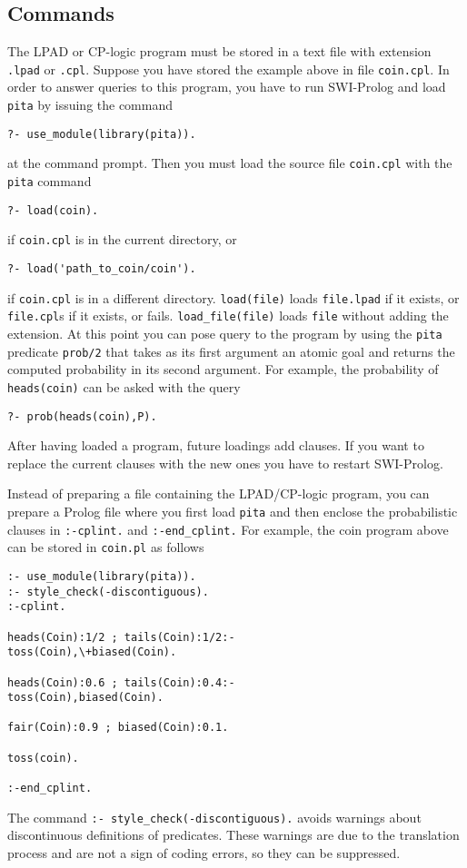 \documentclass[a4paper,10pt]{article}
\begin{document}
\subsection{Commands}
The LPAD or CP-logic program must be stored in a text file with extension \texttt{.lpad} or \texttt{.cpl}. Suppose you have stored the example above in file \texttt{coin.cpl}. 
In order to answer queries to this program, you have to run SWI-Prolog and
load \texttt{pita} by issuing  the command
\begin{verbatim}
?- use_module(library(pita)).
\end{verbatim}
at the command prompt.
Then you must load the source file \texttt{coin.cpl}  with the \texttt{pita} command
\begin{verbatim}
?- load(coin).
\end{verbatim}
if \texttt{coin.cpl} is in the current directory, or 
\begin{verbatim}
?- load('path_to_coin/coin').
\end{verbatim}
if \texttt{coin.cpl} is in a different directory.
\texttt{load(file)} loads \texttt{file.lpad} if it exists, or \texttt{file.cpl}s if it exists, or fails. \texttt{load\_file(file)} loads \texttt{file} without adding the extension.
At this point you can pose query to the program by using the \texttt{pita} predicate \texttt{prob/2} that takes as its first argument an atomic goal and returns the computed probability in its second argument. For example, the probability of \texttt{heads(coin)} can be asked with the query
\begin{verbatim}
?- prob(heads(coin),P).
\end{verbatim}
After having loaded a program, future loadings add clauses. If you want to replace the current clauses with the new ones you have to restart SWI-Prolog.

Instead of preparing a file containing the LPAD/CP-logic program, you can prepare a Prolog file where you first load \texttt{pita} and then enclose the probabilistic 
clauses in \texttt{:-cplint.} and \texttt{:-end\_cplint.} For example, the coin program above can be stored in \texttt{coin.pl} as follows
\begin{verbatim}
:- use_module(library(pita)).
:- style_check(-discontiguous).
:-cplint.

heads(Coin):1/2 ; tails(Coin):1/2:- 
toss(Coin),\+biased(Coin).

heads(Coin):0.6 ; tails(Coin):0.4:- 
toss(Coin),biased(Coin).

fair(Coin):0.9 ; biased(Coin):0.1.

toss(coin).

:-end_cplint.
\end{verbatim}
The command \verb|:- style_check(-discontiguous).| avoids warnings about discontinuous definitions of predicates.
These warnings are due to the translation process and are not a sign of coding errors, so they can be suppressed.
\end{document}
